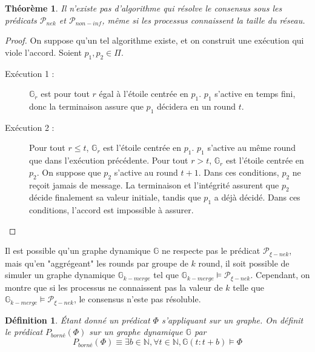 \documentclass{article}
\newtheorem{theorem}{Théorème}
\newtheorem{definition}{Définition}
\begin{document}
\begin{theorem}
	Il n'existe pas d'algorithme qui résolve le consensus sous les prédicats $\mathcal{P}_{nek}$ et $\mathcal{P}_{non-inf}$, même si les processus connaissent la taille du réseau.
\end{theorem}
\begin{proof}
	On suppose qu'un tel algorithme existe, et on construit une exécution qui viole l'accord.
	Soient $p_1, p_2 \in \Pi$.
	\begin{description}

		\item[Exécution 1 :] $\mathds{G}_r$ est pour tout $r$ égal à l'étoile centrée en $p_1$. $p_1$ s'active en temps fini, donc la terminaison assure que $p_1$ décidera en un round $t$.
		\item[Exécution 2 :] Pour tout $r \leq t$, $\mathds{G}_r$ est l'étoile centrée en $p_1$. $p_1$ s'active au même round que dans l'exécution précédente.
			Pour tout $r > t$, $\mathds{G}_r$ est l'étoile centrée en $p_2$. On suppose que $p_2$ s'active au round $t+1$.
			Dans ces conditions, $p_2$ ne reçoit jamais de message. La terminaison et l'intégrité assurent que $p_2$ décide finalement sa valeur initiale,
			tandis que $p_1$ a déjà décidé. Dans ces conditions, l'accord est impossible à assurer.

	\end{description}
\end{proof}

Il est possible qu'un graphe dynamique $\mathds{G}$ ne respecte pas le prédicat $\mathcal{P}_{\xi-nek}$, mais qu'en "aggrégeant" les rounds par groupe de $k$ round, 
il soit possible de simuler un graphe dynamique $\mathds{G}_{k-merge}$ tel que $\mathds{G}_{k-merge} \models \mathcal{P}_{\xi-nek}$.
Cependant, on montre que si les processus ne connaissent pas la valeur de $k$ telle que $\mathds{G}_{k-merge} \models \mathcal{P}_{\xi-nek}$, le consensus n'este pas résoluble.

\begin{definition}
	Étant donné un prédicat $\Phi$ s'appliquant sur un graphe.
	On définit le prédicat $P_{borné}(\Phi)$ sur un graphe dynamique
	$\mathds{G}$ par $$P_{borné}(\Phi) \equiv \exists b \in \mathds{N}, \forall t \in \mathds{N}, \mathds{G}(t:t+b) \models \Phi$$
\end{definition}
\end{document}
